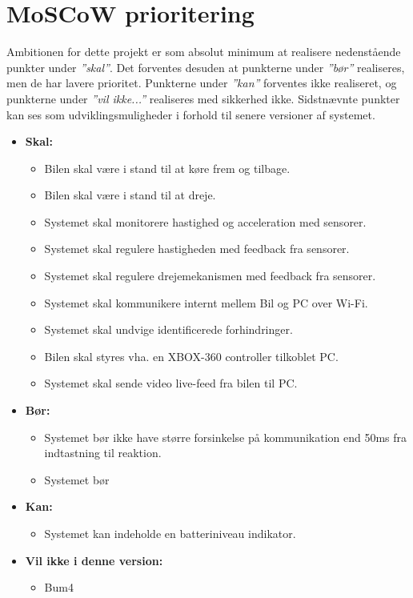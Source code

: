 
\section*{MoSCoW prioritering} \label{sec:moscow_prioritering}

Ambitionen for dette projekt er som absolut minimum at realisere nedenstående punkter under \textit{''skal''}. 
Det forventes desuden at punkterne under \textit{''bør''} realiseres, men de har lavere prioritet.
Punkterne under \textit{''kan''} forventes ikke realiseret, og punkterne under \textit{''vil ikke...''} realiseres med sikkerhed ikke. 
Sidstnævnte punkter kan ses som udviklingsmuligheder i forhold til senere versioner af systemet. 

\begin{itemize}
	\item \textbf{Skal:}
		\begin{itemize}
			\item Bilen skal være i stand til at køre frem og tilbage.
			\item Bilen skal være i stand til at dreje.
			\item Systemet skal monitorere hastighed og acceleration med sensorer.
			\item Systemet skal regulere hastigheden med feedback fra sensorer.
			\item Systemet skal regulere drejemekanismen med feedback fra sensorer.
			\item Systemet skal kommunikere internt mellem Bil og PC over Wi-Fi.
			\item Systemet skal undvige identificerede forhindringer. 
			\item Bilen skal styres vha. en XBOX-360 controller tilkoblet PC.
			\item Systemet skal sende video live-feed fra bilen til PC.
		\end{itemize}
	\item \textbf{Bør:}
		\begin{itemize}
			\item Systemet bør ikke have større forsinkelse på kommunikation end 50ms fra indtastning til reaktion.
			\item Systemet bør 
		\end{itemize}
	\item \textbf{Kan:}
		\begin{itemize}
			\item Systemet kan indeholde en batteriniveau indikator. %
		\end{itemize}
	\item \textbf{Vil ikke i denne version:}	
		\begin{itemize}
			\item Bum4 %
		\end{itemize}
\end{itemize}


